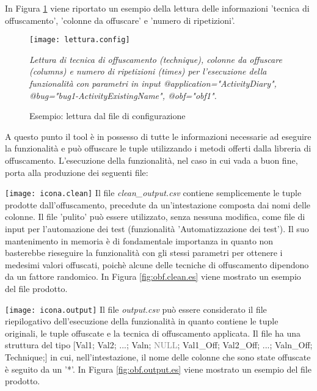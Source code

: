 \bigskip
\noindent In Figura \ref{fig:letcon} viene riportato un esempio della lettura delle informazioni 'tecnica di offuscamento', 'colonne da offuscare' e 'numero di ripetizioni'.

\begin{figure}[H]
	\texttt{[image: lettura.config]}
	\centering
	\caption{Esempio: lettura dal file di configurazione}
	\emph{Lettura di tecnica di offuscamento (technique), colonne da offuscare (columns) e numero di ripetizioni (times) per l'esecuzione della funzionalità con parametri in input @application="ActivityDiary", @bug="bug1-ActivityExistingName", @obf="obf1".}
    \label{fig:letcon}
\end{figure}
\smallskip
\noindent A questo punto il tool è in possesso di tutte le informazioni necessarie ad eseguire la funzionalità e può offuscare le tuple utilizzando i metodi offerti dalla libreria di offuscamento. 
\bigskip  \newline 
\noindent L'esecuzione della funzionalità, nel caso in cui vada a buon fine, porta alla produzione dei seguenti file:

\begin{tcolorbox}[colback=white, colframe=lightgray]
	 \texttt{[image: icona.clean]} \newline
Il file \emph{clean\_output.csv} contiene semplicemente le tuple prodotte dall'offuscamento, precedute da un'intestazione composta dai nomi delle colonne. Il file 'pulito' può essere utilizzato, senza nessuna modifica, come file di input  per l'automazione dei test (funzionalità 'Automatizzazione dei test'). Il suo mantenimento in memoria è di fondamentale importanza in quanto non basterebbe rieseguire la funzionalità con gli stessi parametri per ottenere i medesimi valori offuscati, poichè alcune delle tecniche di offuscamento dipendono da un fattore randomico. In Figura \ref{fig:obf.clean.es} viene mostrato un esempio del file prodotto. 
\end{tcolorbox}

\begin{tcolorbox}[colback=white, colframe=lightgray]
	 \texttt{[image: icona.output]} \newline
Il file \emph{output.csv} può essere considerato il file riepilogativo dell'esecuzione della funzionalità in quanto contiene le tuple originali, le tuple offuscate e la tecnica di offuscamento applicata. Il file ha una struttura del tipo [Val1; Val2; ...; Valn; \textcolor{gray}{NULL}; Val1\_Off; Val2\_Off; ...; Valn\_Off; Technique;] in cui, nell'intestazione,  il nome delle colonne che sono state offuscate è seguito da un '*'. In Figura \ref{fig:obf.output.es} viene mostrato un esempio del file prodotto. 
\end{tcolorbox}

